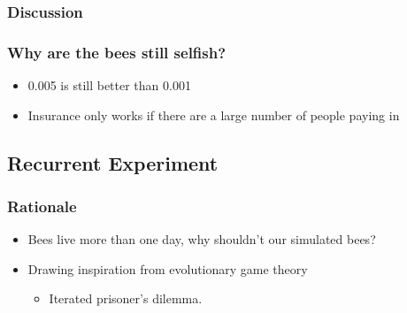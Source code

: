 \documentclass{beamer}
\begin{document}

      \subsubsection{Discussion} %
      \label{ssub:discussion}

        \begin{frame}[c]\frametitle{Why are the bees still selfish?}

          \begin{itemize}
            \item 0.005 is still better than 0.001
            \item Insurance only works if there are a large number of people
                  paying in
          \end{itemize}
        
        \end{frame}


    \subsection{Recurrent Experiment} %
    \label{sub:recurrent_experiment}
    
      \begin{frame}[c]\frametitle{Rationale}
        \begin{itemize}
          \item Bees live more than one day, why shouldn't our simulated bees?
          \item Drawing inspiration from evolutionary game theory
          \begin{itemize}
            \item Iterated prisoner's dilemma.
          \end{itemize}
        \end{itemize}
      \end{frame}
\end{document}
